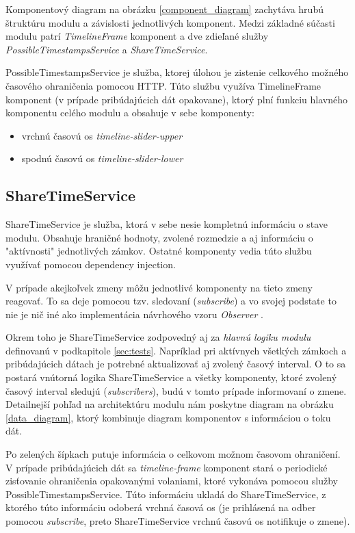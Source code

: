 \documentclass[
  digital, %
  twoside, %
  notable,   %
  nolof,   %
  nolot,   %
]{fithesis3}
\newcommand{\inquotes}[1]{{}"{}#1{}"{}}
\begin{document}
Komponentový diagram na obrázku \ref{component_diagram} zachytáva hrubú štruktúru modulu a závislosti jednotlivých komponent. Medzi základné súčasti modulu patrí \textit{TimelineFrame} komponent a dve zdieľané služby \textit{PossibleTimestampsService} a \textit{ShareTimeService}.

PossibleTimestampsService je služba, ktorej úlohou je zistenie celkového možného časového ohraničenia pomocou HTTP. Túto službu využíva TimelineFrame komponent (v prípade pribúdajúcich dát opakovane), ktorý plní funkciu hlavného komponentu celého modulu a obsahuje v sebe komponenty:
\begin{itemize}
\item vrchnú časovú os \textit{timeline-slider-upper}
\item spodnú časovú os \textit{timeline-slider-lower}
\end{itemize}

\subsection{ShareTimeService}
ShareTimeService je služba, ktorá v sebe nesie kompletnú informáciu o stave modulu. Obsahuje hraničné hodnoty, zvolené rozmedzie a aj informáciu o \inquotes{aktívnosti} jednotlivých zámkov. Ostatné komponenty vedia túto službu využívať pomocou dependency injection.

V prípade akejkoľvek zmeny môžu jednotlivé komponenty na tieto zmeny reagovať. To sa deje pomocou tzv. sledovaní (\textit{subscribe}) a vo svojej podstate to nie je nič iné ako implementácia návrhového vzoru \textit{Observer} \cite{rhrjjv1994elements}.

Okrem toho je ShareTimeService zodpovedný aj za \textit{hlavnú logiku modulu} definovanú v podkapitole \ref{sec:tests}. Napríklad pri aktívnych všetkých zámkoch a pribúdajúcich dátach je potrebné aktualizovať aj zvolený časový interval. O to sa postará vnútorná logika ShareTimeService a všetky komponenty, ktoré zvolený časový interval sledujú (\textit{subscribers}), budú v tomto prípade informovaní o zmene. Detailnejší pohľad na architektúru modulu nám poskytne diagram na obrázku \ref{data_diagram}, ktorý kombinuje diagram komponentov s informáciou o toku dát.

Po zelených šípkach putuje informácia o celkovom možnom časovom ohraničení. V prípade pribúdajúcich dát sa \textit{timeline-frame} komponent stará o periodické zisťovanie ohraničenia opakovanými volaniami, ktoré vykonáva pomocou služby PossibleTimestampsService. Túto informáciu ukladá do ShareTimeService, z ktorého túto informáciu odoberá vrchná časová os (je prihlásená na odber pomocou \textit{subscribe}, preto ShareTimeService vrchnú časovú os notifikuje o zmene).
\end{document}
